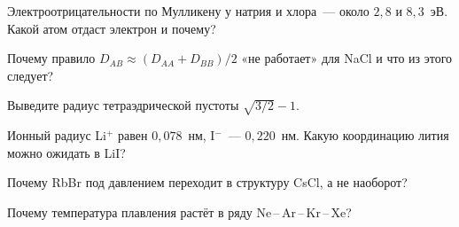 \begin{proverka}
\item Электроотрицательности по Мулликену у натрия и хлора~— около $2{,}8$
и $8{,}3$~эВ. Какой атом отдаст электрон и почему?
\item Почему правило $D_{AB}\approx(D_{AA}+D_{BB})/2$ «не работает» для NaCl
и что из этого следует?
\item Выведите радиус тетраэдрической пустоты $\sqrt{3/2}-1$.
\item Ионный радиус Li$^+$ равен $0{,}078$~нм, I$^-$~— $0{,}220$~нм. Какую
координацию лития можно ожидать в LiI?
\item Почему RbBr под давлением переходит в структуру CsCl, а не
наоборот?
\item Почему температура плавления растёт в ряду Ne\,--\,Ar\,--\,Kr\,--\,Xe?
\end{proverka}
